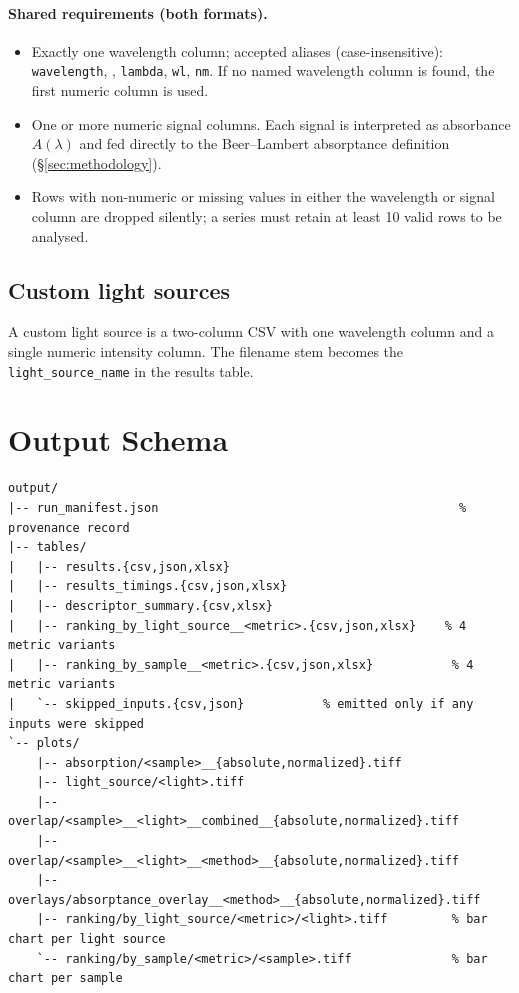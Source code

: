 \documentclass[11pt,a4paper]{article}
\newcommand{\idtt}[1]{\texttt{\seqsplit{#1}}}
\begin{document}
\paragraph{Shared requirements (both formats).}
\begin{itemize}
  \item Exactly one wavelength column; accepted aliases
        (case-insensitive): \texttt{wavelength},
        \idtt{wavelength\_nm}, \texttt{lambda}, \texttt{wl},
        \texttt{nm}. If no named wavelength column is found, the first
        numeric column is used.
  \item One or more numeric signal columns. Each signal is interpreted
        as absorbance \(A(\lambda)\) and fed directly to the
        Beer--Lambert absorptance definition
        (\S\ref{sec:methodology}).
  \item Rows with non-numeric or missing values in either the
        wavelength or signal column are dropped silently; a series must
        retain at least 10 valid rows to be analysed.
\end{itemize}

\subsection{Custom light sources}
A custom light source is a two-column CSV with one wavelength column
and a single numeric intensity column. The filename stem becomes the
\texttt{light\_source\_name} in the results table.

\section{Output Schema}
\label{sec:outputs}

\begin{lstlisting}
output/
|-- run_manifest.json                                          % provenance record
|-- tables/
|   |-- results.{csv,json,xlsx}
|   |-- results_timings.{csv,json,xlsx}
|   |-- descriptor_summary.{csv,xlsx}
|   |-- ranking_by_light_source__<metric>.{csv,json,xlsx}    % 4 metric variants
|   |-- ranking_by_sample__<metric>.{csv,json,xlsx}           % 4 metric variants
|   `-- skipped_inputs.{csv,json}           % emitted only if any inputs were skipped
`-- plots/
    |-- absorption/<sample>__{absolute,normalized}.tiff
    |-- light_source/<light>.tiff
    |-- overlap/<sample>__<light>__combined__{absolute,normalized}.tiff
    |-- overlap/<sample>__<light>__<method>__{absolute,normalized}.tiff
    |-- overlays/absorptance_overlay__<method>__{absolute,normalized}.tiff
    |-- ranking/by_light_source/<metric>/<light>.tiff         % bar chart per light source
    `-- ranking/by_sample/<metric>/<sample>.tiff              % bar chart per sample
\end{lstlisting}
\end{document}
